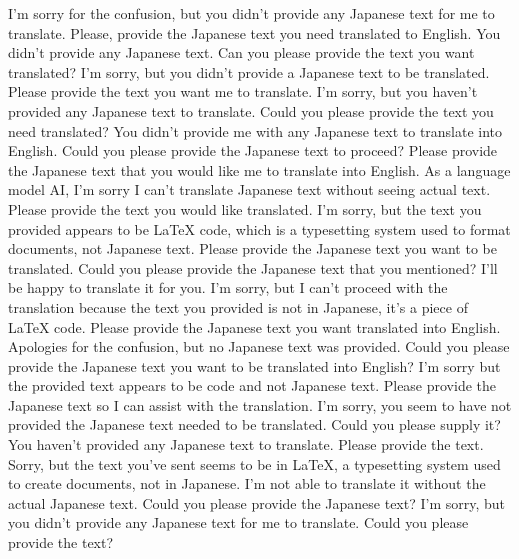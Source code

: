{%
I'm sorry for the confusion, but you didn't provide any Japanese text for me to translate. Please, provide the Japanese text you need translated to English.
You didn't provide any Japanese text. Can you please provide the text you want translated?
I'm sorry, but you didn't provide a Japanese text to be translated. Please provide the text you want me to translate.
I'm sorry, but you haven't provided any Japanese text to translate. Could you please provide the text you need translated?
You didn't provide me with any Japanese text to translate into English. Could you please provide the Japanese text to proceed?
Please provide the Japanese text that you would like me to translate into English.
As a language model AI, I'm sorry I can't translate Japanese text without seeing actual text. Please provide the text you would like translated.
I'm sorry, but the text you provided appears to be LaTeX code, which is a typesetting system used to format documents, not Japanese text. Please provide the Japanese text you want to be translated.
Could you please provide the Japanese text that you mentioned? I'll be happy to translate it for you.
I'm sorry, but I can't proceed with the translation because the text you provided is not in Japanese, it's a piece of LaTeX code. Please provide the Japanese text you want translated into English.
Apologies for the confusion, but no Japanese text was provided. Could you please provide the Japanese text you want to be translated into English?
I'm sorry but the provided text appears to be code and not Japanese text. Please provide the Japanese text so I can assist with the translation.
I'm sorry, you seem to have not provided the Japanese text needed to be translated. Could you please supply it?
You haven't provided any Japanese text to translate. Please provide the text.
Sorry, but the text you've sent seems to be in LaTeX, a typesetting system used to create documents, not in Japanese. I'm not able to translate it without the actual Japanese text. Could you please provide the Japanese text?
I'm sorry, but you didn't provide any Japanese text for me to translate. Could you please provide the text?
}
